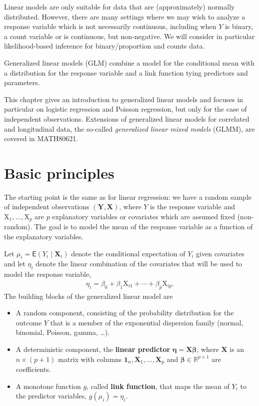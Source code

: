 \documentclass[
  11pt,
  letterpaper,
]{book}
\providecommand{\tightlist}{%
  \setlength{\itemsep}{0pt}\setlength{\parskip}{0pt}}
\theoremstyle{definition}
\theoremstyle{definition}
\theoremstyle{definition}
\theoremstyle{remark}
\begin{document}
Linear models are only suitable for data that are (approximately)
normally distributed. However, there are many settings where we may wish
to analyze a response variable which is not necessarily continuous,
including when \(Y\) is binary, a count variable or is continuous, but
non-negative. We will consider in particular likelihood-based inference
for binary/proportion and counts data.

Generalized linear models (GLM) combine a model for the conditional mean
with a distribution for the response variable and a link function tying
predictors and parameters.

This chapter gives an introduction to generalized linear models and
focuses in particular on logistic regression and Poisson regression, but
only for the case of independent observations. Extensions of generalized
linear models for correlated and longitudinal data, the so-called
\emph{generalized linear mixed models} (GLMM), are covered in MATH80621.

\hypertarget{basic-principles}{%
\section{Basic principles}\label{basic-principles}}

The starting point is the same as for linear regression: we have a
random sample of independent observations
\((\boldsymbol{Y}, \mathbf{X})\), where \(Y\) is the response variable and
\(\mathrm{X}_1, \ldots, \mathrm{X}_p\) are \(p\) explanatory variables or
covariates which are assumed fixed (non-random). The goal is to model
the mean of the response variable as a function of the explanatory
variables.

Let \(\mu_i=\mathsf{E}(Y_i \mid \mathbf{X}_i)\) denote the conditional
expectation of \(Y_i\) given covariates and let \(\eta_i\) denote the linear
combination of the covariates that will be used to model the response
variable,
\begin{align*}
\eta_i=\beta_0 + \beta_1 \mathrm{X}_{i1} + \cdots + \beta_p \mathrm{X}_{ip}.
\end{align*}
The building blocks of the generalized linear model are

\begin{itemize}
\tightlist
\item
  A random component, consisting of the probability distribution for the outcome \(Y\) that is a member of the exponential dispersion family (normal, binomial, Poisson, gamma, \ldots).
\item
  A deterministic component, the \textbf{linear predictor} \(\boldsymbol{\eta}=\mathbf{X} \boldsymbol{\beta}\), where \(\mathbf{X}\) is an \(n\times (p+1)\) matrix with columns \(\mathbf{1}_n, \mathbf{X}_1, \ldots, \mathbf{X}_p\) and \(\boldsymbol{\beta} \in \mathbb{R}^{p+1}\) are coefficients.
\item
  A monotone function \(g\), called \textbf{link function}, that maps the mean of \(Y_i\) to the predictor variables, \(g(\mu_i)=\eta_i\).
\end{itemize}
\end{document}
